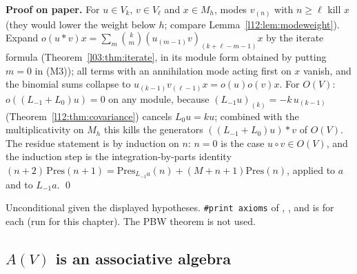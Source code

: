 \textbf{Proof on paper.} For $u\in V_k$, $v\in V_\ell$ and $x\in M_h$, modes $v_{(n)}$ with $n\ge\ell$ kill $x$ (they would lower the weight below $h$; compare
Lemma~\ref{l12:lem:modeweight}). Expand $o(u*v)x = \sum_m\binom km(u_{(m-1)}v)_{(k+\ell-m-1)}x$ by the iterate formula (Theorem~\ref{l03:thm:iterate}, in its
module form obtained by putting $m=0$ in (M3)); all terms with an annihilation mode acting first on $x$ vanish, and the binomial sums collapse to
$u_{(k-1)}v_{(\ell-1)}x = o(u)o(v)x$. For $O(V)$: $o((L_{-1}+L_0)u)=0$ on any module, because $(L_{-1}u)_{(k)} = -k\,u_{(k-1)}$
(Theorem~\ref{l12:thm:covariance}) cancels $L_0u = ku$; combined with the multiplicativity on $M_h$ this kills the generators $((L_{-1}+L_0)u)*v$
of $O(V)$. The residue statement is by induction on $n$: $n=0$ is the case $u\circ v\in O(V)$, and the induction step is the integration-by-parts
identity $(n+2)\,\mathrm{Pres}(n+1) = \mathrm{Pres}_{L_{-1}a}(n) + (M+n+1)\mathrm{Pres}(n)$, applied to $a$ and to $L_{-1}a$. \qed

\begin{status}
Unconditional given the displayed hypotheses. \texttt{\#print axioms} of , ,
 and  is \lean{[propext, Classical.}\allowbreak{}\allowbreak\lean{sound]}
for each (run for this chapter). The PBW theorem  is not used.
\end{status}

\subsection{\texorpdfstring{$A(V)$}{A(V)} is an associative algebra}

